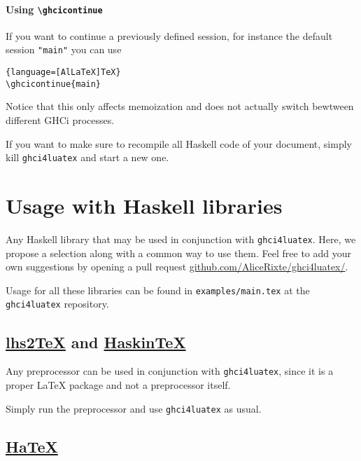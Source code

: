 \documentclass{article}
\begin{document}
\paragraph{Using \texttt{\textbackslash ghcicontinue}} If you want to continue a previously defined session, for instance the default session \texttt{"main"} you can use

\begin{lstlisting}{language=[AlLaTeX]TeX}
\ghcicontinue{main}
\end{lstlisting}

Notice that this only affects memoization and does not actually switch bewtween different GHCi processes.

\begin{tipbox}
  If you want to make sure to recompile all Haskell code of your document, simply kill \texttt{ghci4luatex} and start a new one.
\end{tipbox}


\section{Usage with Haskell libraries}

Any Haskell library that may be used in conjunction with \texttt{ghci4luatex}. Here, we propose a selection along with a common way to use them. Feel free to add your own suggestions by opening a pull request \href{https://github.com/AliceRixte/ghci4luatex/}{github.com/AliceRixte/ghci4luatex/}.


Usage for all these libraries can be found in \texttt{examples/main.tex} at the \texttt{ghci4luatex} repository.

\subsection{\href{https://hackage.haskell.org/package/lhs2tex}{lhs2TeX} and \href{https://daniel-diaz.github.io/projects/haskintex/}{HaskinTeX}}

Any preprocessor can be used in conjunction with \texttt{ghci4luatex}, since it is a proper LaTeX package and not a preprocessor itself.

Simply run the preprocessor and use \texttt{ghci4luatex} as usual.

\subsection{\href{https://hackage.haskell.org/package/HaTeX}{HaTeX}}
\end{document}
